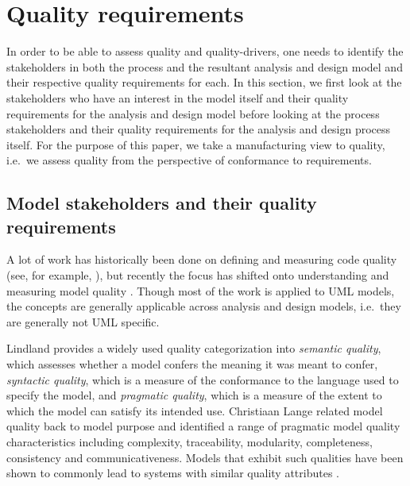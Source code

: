 \section{Quality requirements}
\label{sec:qualityRequirements}

In order to be able to assess quality and quality-drivers, one needs to identify the stakeholders in both the process and the resultant analysis and design model and their respective quality requirements for each. In this section, we first look at the stakeholders who have an interest in the model itself and their quality requirements for the analysis and design model before looking at the process stakeholders and their quality requirements for the analysis and design process itself. For the purpose of this paper, we take a manufacturing view \cite{garvin_what_1984} to quality, i.e.\ we assess quality from the perspective of conformance to requirements. 


\subsection{Model stakeholders and their quality requirements}
\label{sec:modelStakeholdersAndQualityRequirements}

A lot of work has historically been done on defining and measuring code quality (see, for example, \cite{boehm_barry_w._characteristics_1978}), but recently the focus has shifted onto understanding and measuring model quality \cite{lange_managing_2005,lange_improving_2006,shim_design_2008,qi_yu-dong_analysis_2010}. Though most of the work is applied to UML models, the concepts are generally applicable across analysis and design models, i.e.\ they are generally not UML specific. 

Lindland\cite{lindland_understanding_1994} provides a widely used quality categorization into \emph{semantic quality}, which assesses whether a model confers the meaning it was meant to confer, \emph{syntactic quality}, which is a measure of the conformance to the language used to specify the model, and \emph{pragmatic quality}, which is a measure of the extent to which the model can satisfy its intended use. Christiaan Lange  \cite{lange_christiaan_assessing_2007} related model quality back to model purpose and identified a range of pragmatic model quality characteristics including complexity, traceability, modularity, completeness, consistency and communicativeness. Models that exhibit such qualities have been shown to commonly lead to systems with similar quality attributes \cite{podgorelec_estimating_2007}.

